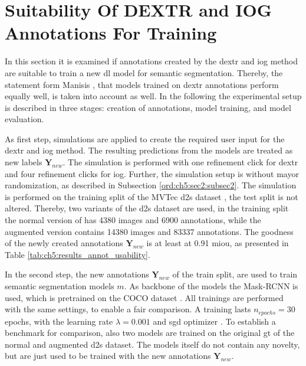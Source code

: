
\section{Suitability Of DEXTR and IOG Annotations For Training} \label{ord:ch5:sec5_retrain}
In this section it is examined if annotations created by the \gls{dextr} and \gls{iog} method are suitable to train a new \gls{dl} model for semantic segmentation.
Thereby, the statement form Manisis \etal, that models trained on \gls{dextr} annotations perform equally well\cite{Man18-DEXTR}, is taken into account as well.
In the following the experimental setup is described in three stages: creation of annotations, model training, and model evaluation.
 
As first step, simulations are applied to create the required user input for the \gls{dextr} and \gls{iog} method.
The resulting predictions from the models are treated as new labels $ \textbf{Y}_{new} $. 
The simulation is performed with one refinement click for \gls{dextr} and four refinement clicks for \gls{iog}.
Further, the simulation setup is without mayor randomization, as described in Subsection \ref{ord:ch5:sec2:subsec2}.
The simulation is performed on the training split of the MVTec \gls{d2s} dataset \cite{Paddo18-D2S}, the test split is not altered.
Thereby, two variants of the \gls{d2s} dataset are used, in the training split the normal version of has 4380 images and 6900 annotations, while the augmented version contains 14380 images and 83337 annotations.
The goodness of the newly created annotations $ \textbf{Y}_{new} $ is at least at 0.91 \gls{miou}, as presented in Table \ref{tab:ch5:results_annot_usability}.

In the second step, the new annotations $ \textbf{Y}_{new} $ of the train split, are used to train semantic segmentation models $ m $.
As backbone of the models the Mask-RCNN \cite{He17-MaskR-CNN} is used, which is pretrained on the COCO dataset \cite{Lin14-Coco}.
All trainings are performed with the same settings, to enable a fair comparison.
A training lasts $ n_{epochs} = 30 $ epochs, with the learning rate $ \lambda = 0.001 $ and \gls{sgd} optimizer \cite{Ruder16-SGD}.
To establish a benchmark for comparison, also two models are trained on the original \gls{gt} of the normal and augmented \gls{d2s} dataset.
The models itself do not contain any novelty, but are just used to be trained with the new annotations $ \textbf{Y}_{new} $.


